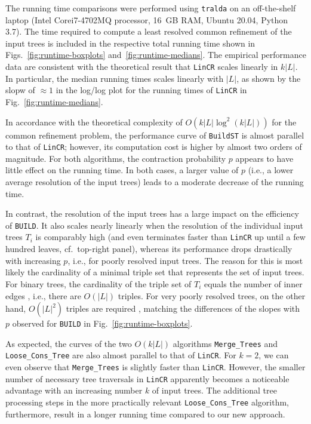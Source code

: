 \documentclass[11pt]{article}
\begin{document}
The running time comparisons were performed using \texttt{tralda} on an
off-the-shelf laptop (Intel\textsuperscript{\textregistered}
Core\texttrademark\;i7-4702MQ processor, 16~GB RAM, Ubuntu 20.04, Python
3.7).  The time required to compute a least resolved common refinement of
the input trees is included in the respective total running time shown in
Figs.~\ref{fig:runtime-boxplots} and~\ref{fig:runtime-medians}. The
empirical performance data are consistent with the theoretical result that
\texttt{LinCR} scales linearly in $k|L|$.  In particular, the median
running times scales linearly with $|L|$, as shown by the slopw of
$\approx 1$ in the log/log plot for the running times of \texttt{LinCR} in
Fig.~\ref{fig:runtime-medians}.

In accordance with the theoretical complexity of $O(k|L| \log^2(k|L|))$ for
the common refinement problem, the performance curve of \texttt{BuildST} is
almost parallel to that of \texttt{LinCR}; however, its computation cost is
higher by almost two orders of magnitude.  For both algorithms, the
contraction probability $p$ appears to have little effect on the running
time. In both cases, a larger value of $p$ (i.e., a lower average
resolution of the input trees) leads to a moderate decrease of the running
time.

In contrast, the resolution of the input trees has a large impact on the
efficiency of \texttt{BUILD}. It also scales nearly linearly when the
resolution of the individual input trees $T_i$ is comparably high (and even
terminates faster than \texttt{LinCR} up until a few hundred leaves, cf.\
top-right panel), whereas its performance drops drastically with increasing
$p$, i.e., for poorly resolved input trees.  The reason for this is most
likely the cardinality of a minimal triple set that represents the set of
input trees.  For binary trees, the cardinality of the triple set of $T_i$
equals the number of inner edges \cite{Gruenewald:07a}, i.e., there are
$O(|L|)$ triples. For very poorly resolved trees, on the other hand,
$O(|L|^2)$ triples are required \cite{Seemann:18}, matching the differences
of the slopes with $p$ observed for \texttt{BUILD} in
Fig.~\ref{fig:runtime-boxplots}.

As expected, the curves of the two $O(k|L|)$ algorithms
\texttt{Merge_Trees} and \texttt{Loose_Cons_Tree} are also almost parallel
to that of \texttt{LinCR}.  For $k=2$, we can even observe that
\texttt{Merge_Trees} is slightly faster than \texttt{LinCR}. However, the
smaller number of necessary tree traversals in \texttt{LinCR} apparently
becomes a noticeable advantage with an increasing number $k$ of input
trees.  The additional tree processing steps in the more practically
relevant \texttt{Loose_Cons_Tree} algorithm, furthermore, result in a
longer running time compared to our new approach.
\end{document}
